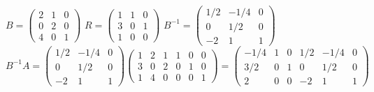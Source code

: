 \documentclass{article}
\begin{document}
\begin{center}
   $ B =
   \begin{pmatrix}
      2 & 1 & 0\\
      0 & 2 & 0\\ 
      4 & 0 & 1
   \end{pmatrix}$
   $ R =
   \begin{pmatrix}
     1  &  1  &  0 \\
     3  &  0  &  1 \\  
     1  &  0  &  0   
   \end{pmatrix}$
   $ B^{-1} =
   \begin{pmatrix}
      1/2 & -1/4 & 0\\
      0   & 1/2  & 0\\ 
      -2  & 1    & 1
   \end{pmatrix}$
   \\
   \vspace{5mm} %
   $B^{-1}A=
   \begin{pmatrix}
      1/2 & -1/4 & 0\\
      0   & 1/2  & 0\\ 
      -2  & 1    & 1
   \end{pmatrix}
   \begin{pmatrix}
     1  &  2  &  1  &  1  &  0  &   0  \\
     3  &  0  &  2  &  0  &  1  &   0  \\  
     1  &  4  &  0  &  0  &  0  &  1  
   \end{pmatrix}
   = 
   \begin{pmatrix}
     -1/4  &  1  &  0  &  1/2  &  -1/4  &   0  \\
     3/2   &  0  &  1  &  0    &   1/2  &   0  \\  
     2     &  0  &  0  &  -2    &  1     &  1  
   \end{pmatrix}$
   \\
   \vspace{5mm} %
   

\end{center}
\end{document}
